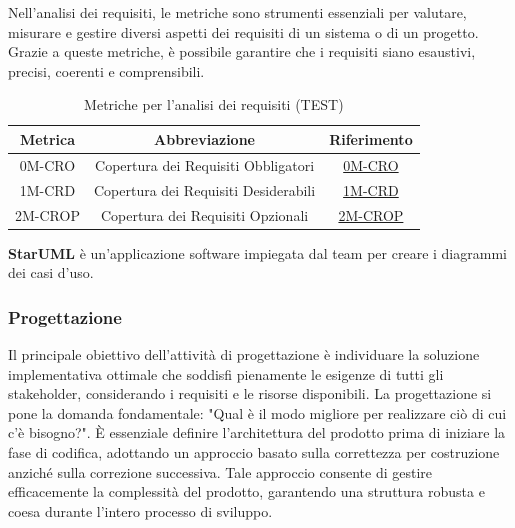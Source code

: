 Nell'analisi dei requisiti, le metriche sono strumenti essenziali per valutare, misurare e gestire diversi aspetti dei requisiti di un sistema o di un progetto. Grazie a queste metriche, è possibile garantire che i requisiti siano esaustivi, precisi, coerenti e comprensibili.
\\
\begin{table}[!h]
    \centering
    \begin{tabular}{|c|c|c|}
    \hline
    \textbf{Metrica} & \textbf{Abbreviazione} & \textbf{Riferimento} \\
    \hline
    0M-CRO & Copertura dei Requisiti Obbligatori & \hyperlink{subsection.6.2}{0M-CRO} \\
    1M-CRD & Copertura dei Requisiti Desiderabili & \hyperlink{subsection.6.2}{1M-CRD} \\
    2M-CROP & Copertura dei Requisiti Opzionali & \hyperlink{subsection.6.2}{2M-CROP} \\
    \hline
    \end{tabular}
    \caption{Metriche per l'analisi dei requisiti (TEST)}
    \label{tab:2}
\end{table}

\textbf{StarUML} è un'applicazione software impiegata dal team per creare i diagrammi dei casi d'uso.


\subsubsection{Progettazione}
Il principale obiettivo dell'attività di progettazione è individuare la soluzione implementativa ottimale che soddisfi pienamente le esigenze di tutti gli stakeholder, considerando i requisiti e le risorse disponibili. La progettazione si pone la domanda fondamentale: "Qual è il modo migliore per realizzare ciò di cui c'è bisogno?". È essenziale definire l'architettura del prodotto prima di iniziare la fase di codifica, adottando un approccio basato sulla correttezza per costruzione anziché sulla correzione successiva. Tale approccio consente di gestire efficacemente la complessità del prodotto, garantendo una struttura robusta e coesa durante l'intero processo di sviluppo.

